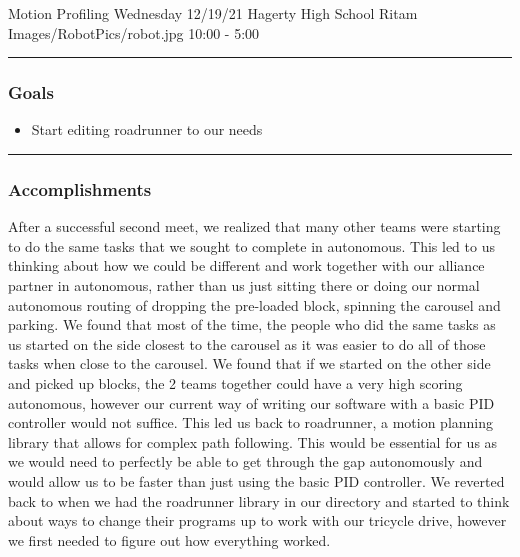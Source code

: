 \insertmeeting 
	{Motion Profiling Wednesday} 
	{12/19/21} 
	{Hagerty High School}
	{Ritam}
	{Images/RobotPics/robot.jpg}
	{10:00 - 5:00}
	
\noindent\hfil\rule{\textwidth}{.4pt}\hfil
\subsubsection*{Goals}
\begin{itemize}
    \item Start editing roadrunner to our needs 

\end{itemize} 

\noindent\hfil\rule{\textwidth}{.4pt}\hfil

\subsubsection*{Accomplishments}
After a successful second meet, we realized that many other teams were starting to do the same tasks that we sought to complete in autonomous. This led to us thinking about how we could be different and work together with our alliance partner in autonomous, rather than us just sitting there or doing our normal autonomous routing of dropping the pre-loaded block, spinning the carousel and parking. We found that most of the time, the people who did the same tasks as us started on the side closest to the carousel as it was easier to do all of those tasks when close to the carousel. We found that if we started on the other side and picked up blocks, the 2 teams together could have a very high scoring autonomous, however our current way of writing our software with a basic PID controller would not suffice. This led us back to roadrunner, a motion planning library that allows for complex path following. This would be essential for us as we would need to perfectly be able to get through the gap autonomously and would allow us to be faster than just using the basic PID controller. We reverted back to when we had the roadrunner library in our directory and started to think about ways to change their programs up to work with our tricycle drive, however we first needed to figure out how everything worked. 
 


